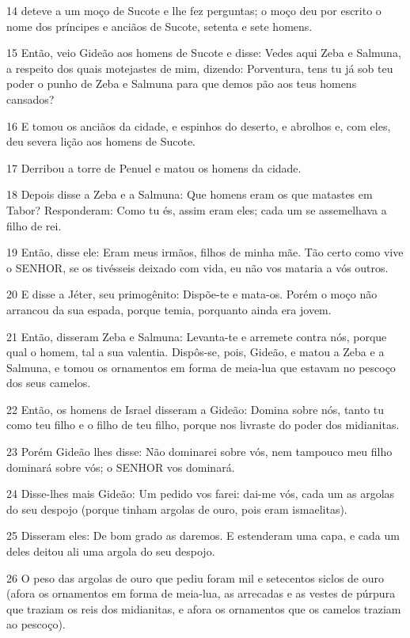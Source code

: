 \par 14 deteve a um moço de Sucote e lhe fez perguntas; o moço deu por escrito o nome dos príncipes e anciãos de Sucote, setenta e sete homens.
\par 15 Então, veio Gideão aos homens de Sucote e disse: Vedes aqui Zeba e Salmuna, a respeito dos quais motejastes de mim, dizendo: Porventura, tens tu já sob teu poder o punho de Zeba e Salmuna para que demos pão aos teus homens cansados?
\par 16 E tomou os anciãos da cidade, e espinhos do deserto, e abrolhos e, com eles, deu severa lição aos homens de Sucote.
\par 17 Derribou a torre de Penuel e matou os homens da cidade.
\par 18 Depois disse a Zeba e a Salmuna: Que homens eram os que matastes em Tabor? Responderam: Como tu és, assim eram eles; cada um se assemelhava a filho de rei.
\par 19 Então, disse ele: Eram meus irmãos, filhos de minha mãe. Tão certo como vive o SENHOR, se os tivésseis deixado com vida, eu não vos mataria a vós outros.
\par 20 E disse a Jéter, seu primogênito: Dispõe-te e mata-os. Porém o moço não arrancou da sua espada, porque temia, porquanto ainda era jovem.
\par 21 Então, disseram Zeba e Salmuna: Levanta-te e arremete contra nós, porque qual o homem, tal a sua valentia. Dispôs-se, pois, Gideão, e matou a Zeba e a Salmuna, e tomou os ornamentos em forma de meia-lua que estavam no pescoço dos seus camelos.
\par 22 Então, os homens de Israel disseram a Gideão: Domina sobre nós, tanto tu como teu filho e o filho de teu filho, porque nos livraste do poder dos midianitas.
\par 23 Porém Gideão lhes disse: Não dominarei sobre vós, nem tampouco meu filho dominará sobre vós; o SENHOR vos dominará.
\par 24 Disse-lhes mais Gideão: Um pedido vos farei: dai-me vós, cada um as argolas do seu despojo (porque tinham argolas de ouro, pois eram ismaelitas).
\par 25 Disseram eles: De bom grado as daremos. E estenderam uma capa, e cada um deles deitou ali uma argola do seu despojo.
\par 26 O peso das argolas de ouro que pediu foram mil e setecentos siclos de ouro (afora os ornamentos em forma de meia-lua, as arrecadas e as vestes de púrpura que traziam os reis dos midianitas, e afora os ornamentos que os camelos traziam ao pescoço).
